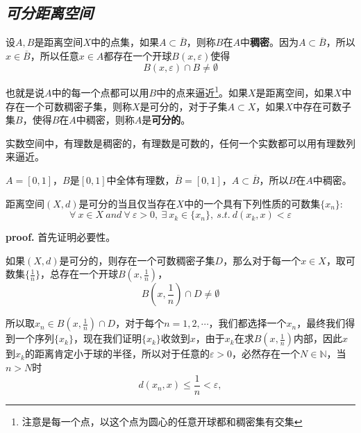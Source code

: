 \subsection*{\textsl{可分距离空间}}

设$A,B$是距离空间$X$中的点集，如果$A\subset \overline{B}$，则称$B$在$A$中\textbf{稠密}。因为$A\subset \overline{B}$，所以$x\in \overline{B}$，所以任意$x\in A$都存在一个开球$B(x,\varepsilon)$使得
\begin{equation}
    B(x,\varepsilon)\cap B\neq \emptyset
\end{equation}

也就是说$A$中的每一个点都可以用$B$中的点来逼近\footnote{注意是每一个点，以这个点为圆心的任意开球都和稠密集有交集}。如果$X$是距离空间，如果$X$中存在一个可数稠密子集，则称$X$是可分的，对于子集$A\subset X$，如果$X$中存在可数子集$B$，使得$B$在$A$中稠密，则称$A$是\textbf{可分的}。

实数空间中，有理数是稠密的，有理数是可数的，任何一个实数都可以用有理数列来逼近。

\begin{example}
    $A=[0,1]$，$B$是$[0,1]$中全体有理数，$\overline{B}=[0,1]$，$A\subset \overline{B}$，所以$B$在$A$中稠密。
\end{example}

\begin{mdframed}
    \begin{proposition}
        距离空间$(X,d)$是可分的当且仅当存在$X$中的一个具有下列性质的可数集$\{x_n\}:$
        \begin{equation}
            \forall\ x\in X\ and\ \forall\ \varepsilon>0,\ \exists\ x_k\in \{x_n\},\ s.t.\ d(x_k,x)<\varepsilon
        \end{equation}
    \end{proposition}
\end{mdframed}

\textbf{proof.} 首先证明必要性。

如果$(X,d)$是可分的，则存在一个可数稠密子集$D$，那么对于每一个$x\in X$，取可数集$\{\frac{1}{n}\}$，总存在一个开球$B(x,\frac{1}{n})$，
\begin{equation}
    B(x,\frac{1}{n})\cap D\neq \emptyset
\end{equation}

所以取$x_n\in B(x,\frac{1}{n})\cap D$，对于每个$n=1,2,\cdots$，我们都选择一个$x_n$，最终我们得到一个序列$\{x_k\}$，现在我们证明$\{x_k\}$收敛到$x$，由于$x_k$在求$B(x,\frac{1}{n})$内部，因此$x$到$x_k$的距离肯定小于球的半径，所以对于任意的$\varepsilon>0$，必然存在一个$N\in \mathbb{N}$，当$n>N$时
\begin{equation}
    d(x_n,x)\leqslant \frac{1}{n}<\varepsilon,
\end{equation}


